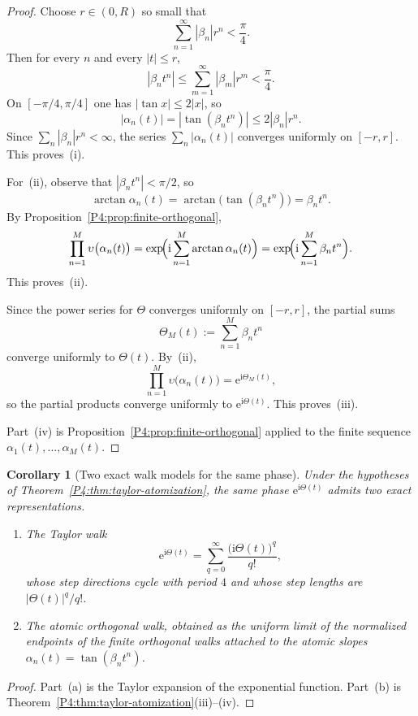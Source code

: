 \documentclass[11pt,a4paper]{article}
\numberwithin{equation}{section}
\newtheorem{corollary}[theorem]{Corollary}
\theoremstyle{definition}
\theoremstyle{remark}
\newcommand{\e}{\mathrm e}
\newcommand{\ii}{\mathrm i}
\begin{document}
\begin{proof}
Choose $r\in(0,R)$ so small that
\[
\sum_{n=1}^{\infty}|\beta_n|r^n<\frac{\pi}{4}.
\]
Then for every $n$ and every $|t|\le r$,
\[
|\beta_n t^n|\le \sum_{m=1}^{\infty}|\beta_m|r^m<\frac{\pi}{4}.
\]
On $[-\pi/4,\pi/4]$ one has $|\tan x|\le 2|x|$, so
\[
|\alpha_n(t)|=|\tan(\beta_n t^n)|\le 2|\beta_n|r^n.
\]
Since $\sum_n |\beta_n|r^n<\infty$, the series $\sum_n |\alpha_n(t)|$ converges uniformly on $[-r,r]$.  This proves~(i).

For~(ii), observe that $|\beta_n t^n|<\pi/2$, so
\[
\arctan\alpha_n(t)=\arctan\bigl(\tan(\beta_n t^n)\bigr)=\beta_n t^n.
\]
By Proposition~\ref{P4:prop:finite-orthogonal},
\[
\prod_{n=1}^M \upsilon\bigl(\alpha_n(t)\bigr)
=\exp\!\Bigl(\ii\sum_{n=1}^M \arctan\alpha_n(t)\Bigr)
=\exp\!\Bigl(\ii\sum_{n=1}^M \beta_n t^n\Bigr).
\]
This proves~(ii).

Since the power series for $\Theta$ converges uniformly on $[-r,r]$, the partial sums
\[
\Theta_M(t):=\sum_{n=1}^M\beta_n t^n
\]
converge uniformly to $\Theta(t)$.  By~(ii),
\[
\prod_{n=1}^M \upsilon\bigl(\alpha_n(t)\bigr)=\e^{\ii\Theta_M(t)},
\]
so the partial products converge uniformly to $\e^{\ii\Theta(t)}$.  This proves~(iii).

Part~(iv) is Proposition~\ref{P4:prop:finite-orthogonal} applied to the finite sequence $\alpha_1(t),\dots,\alpha_M(t)$.
\end{proof}

\begin{corollary}[Two exact walk models for the same phase]\label{P4:cor:two-walks}
Under the hypotheses of Theorem~\ref{P4:thm:taylor-atomization}, the same phase $\e^{\ii\Theta(t)}$ admits two exact representations.
\begin{enumerate}[label=(\alph*)]
\item The \emph{Taylor walk}
\[
\e^{\ii\Theta(t)}=\sum_{q=0}^{\infty}\frac{\bigl(\ii\Theta(t)\bigr)^q}{q!},
\]
whose step directions cycle with period $4$ and whose step lengths are $|\Theta(t)|^q/q!$.
\item The \emph{atomic orthogonal walk}, obtained as the uniform limit of the normalized endpoints of the finite orthogonal walks attached to the atomic slopes $\alpha_n(t)=\tan(\beta_n t^n)$.
\end{enumerate}
\end{corollary}

\begin{proof}
Part~(a) is the Taylor expansion of the exponential function.  Part~(b) is Theorem~\ref{P4:thm:taylor-atomization}(iii)--(iv).
\end{proof}
\end{document}
